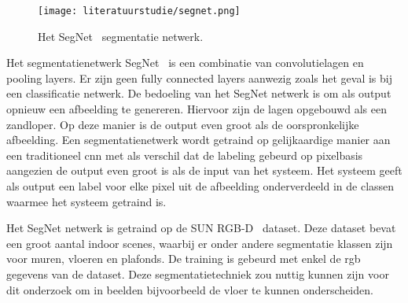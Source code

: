         \begin{figure}[!htb]
            \centering
            \texttt{[image: literatuurstudie/segnet.png]}
            \caption{Het SegNet~\cite{Badrinarayanan} segmentatie netwerk.}
            \label{fig:segnet_cnn}
        \end{figure}

        Het segmentatienetwerk SegNet~\cite{Badrinarayanan} is een combinatie van convolutielagen en pooling layers. Er zijn geen fully connected layers aanwezig zoals het geval is bij een classificatie netwerk.
        De bedoeling van het SegNet netwerk is om als output opnieuw een afbeelding te genereren. Hiervoor zijn de lagen opgebouwd als een zandloper. Op deze manier is de output even groot als de oorspronkelijke afbeelding.
        Een segmentatienetwerk wordt getraind op gelijkaardige manier aan een traditioneel \gls{cnn} met als verschil dat de labeling gebeurd op pixelbasis aangezien de output even groot is als de input van het systeem.
        Het systeem geeft als output een label voor elke pixel uit de afbeelding onderverdeeld in de classen waarmee het systeem getraind is.

        Het SegNet netwerk is getraind op de SUN RGB-D~\cite{Song_2015_CVPR} dataset. Deze dataset bevat een groot aantal indoor scenes, waarbij er onder andere segmentatie klassen zijn voor muren, vloeren en plafonds.
        De training is gebeurd met enkel de \gls{rgb} gegevens van de dataset.
        Deze segmentatietechniek zou nuttig kunnen zijn voor dit onderzoek om in beelden bijvoorbeeld de vloer te kunnen onderscheiden.
